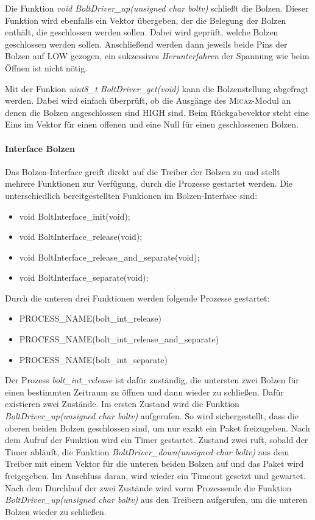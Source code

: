 Die Funktion \textit{void BoltDriver\_up(unsigned char boltv)} schließt die Bolzen. Dieser Funktion wird ebenfalls ein Vektor übergeben, der die Belegung der Bolzen enthält, die geschlossen werden sollen. Dabei wird geprüft, welche Bolzen geschlossen werden sollen. Anschließend werden dann jeweils beide Pins der Bolzen auf LOW gezogen, ein sukzessives \textit{Herunterfahren} der Spannung wie beim Öffnen ist nicht nötig.

Mit der Funkion \textit{uint8\_t BoltDriver\_get(void)} kann die Bolzenstellung abgefragt werden. Dabei wird einfach überprüft, ob die Ausgänge des \textsc{Mica}z-Modul an denen die Bolzen angeschlossen sind HIGH sind. Beim Rückgabevektor steht eine Eins im Vektor für einen offenen und eine Null für einen geschlossenen Bolzen.

\paragraph{Interface Bolzen}
Das Bolzen-Interface greift direkt auf die Treiber der Bolzen zu und stellt mehrere Funktionen zur Verfügung, durch die Prozesse gestartet werden. Die unterschiedlich bereitgestellten Funkionen im Bolzen-Interface sind:
\begin{itemize}
  \item void BoltInterface\_init(void);
  \item void BoltInterface\_release(void);
  \item void BoltInterface\_release\_and\_separate(void);
  \item void BoltInterface\_separate(void);
\end{itemize}

Durch die unteren drei Funktionen werden folgende Prozesse gestartet:
\begin{itemize}
  \item PROCESS\_NAME(bolt\_int\_release)
  \item PROCESS\_NAME(bolt\_int\_release\_and\_separate)
  \item PROCESS\_NAME(bolt\_int\_separate)
\end{itemize}

Der Prozess \textit{bolt\_int\_release} ist dafür zuständig, die untersten zwei Bolzen für einen bestimmten Zeitraum zu öffnen und dann wieder zu schließen. Dafür existieren zwei Zustände. Im ersten Zustand wird die Funktion \textit{BoltDriver\_up(unsigned char boltv)} aufgerufen. So wird sichergestellt, dass die oberen beiden Bolzen geschlossen sind, um nur exakt ein Paket freizugeben. Nach dem Aufruf der Funktion wird ein Timer gestartet. Zustand zwei ruft, sobald der Timer abläuft, die Funktion \textit{BoltDriver\_down(unsigned char boltv)} aus dem Treiber mit einem Vektor für die unteren beiden Bolzen auf und das Paket wird freigegeben. Im Anschluss daran, wird wieder ein Timeout gesetzt und gewartet. Nach dem Durchlauf der zwei Zustände wird vorm Prozessende die Funktion \textit{BoltDriver\_up(unsigned char boltv)} aus den Treibern aufgerufen, um die unteren Bolzen wieder zu schließen.

